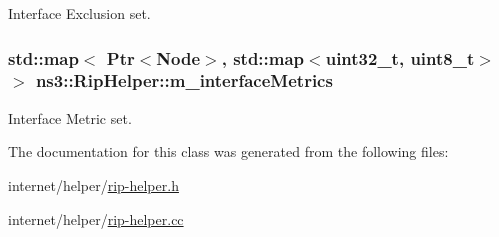 Interface Exclusion set. 

\subsubsection[{\texorpdfstring{m\+\_\+interface\+Metrics}{m_interfaceMetrics}}]{\setlength{\rightskip}{0pt plus 5cm}std\+::map$<$ {\bf Ptr}$<${\bf Node}$>$, std\+::map$<$uint32\+\_\+t, uint8\+\_\+t$>$ $>$ ns3\+::\+Rip\+Helper\+::m\+\_\+interface\+Metrics\hspace{0.3cm}{\ttfamily [private]}}\hypertarget{classns3_1_1RipHelper_a61fdf6837031cb851e1e85b6f7feab61}{}\label{classns3_1_1RipHelper_a61fdf6837031cb851e1e85b6f7feab61}


Interface Metric set. 



The documentation for this class was generated from the following files\+:\begin{DoxyCompactItemize}
\item 
internet/helper/\hyperlink{rip-helper_8h}{rip-\/helper.\+h}\item 
internet/helper/\hyperlink{rip-helper_8cc}{rip-\/helper.\+cc}\end{DoxyCompactItemize}
